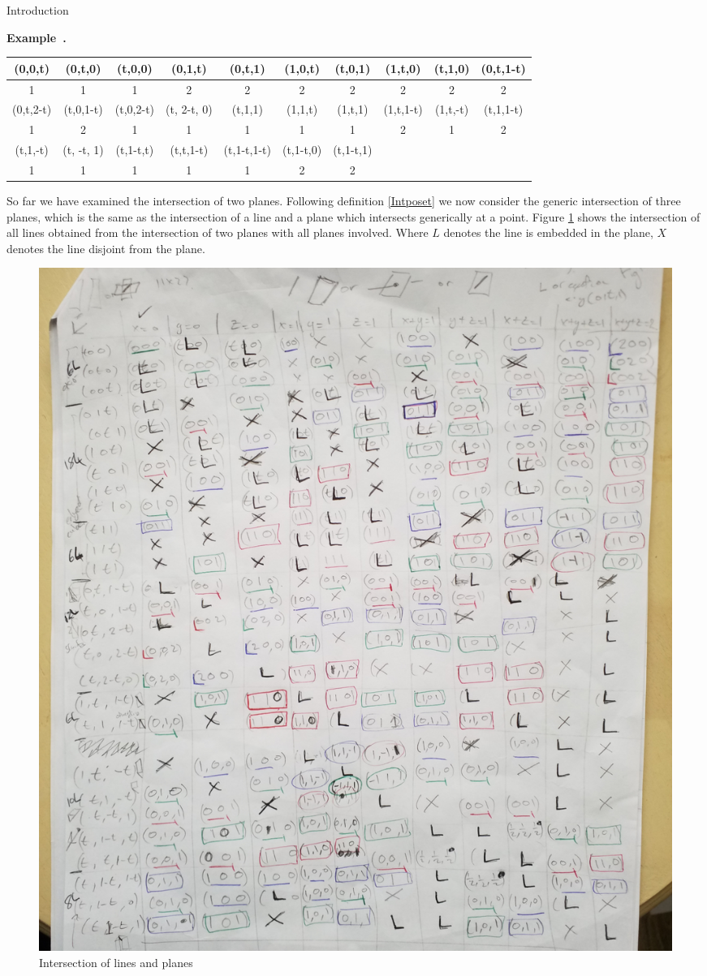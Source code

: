 \documentclass[a4paper,12pt]{article}
\newcounter{example}[]
\newenvironment{example}[1][]{\refstepcounter{example}\par\medskip
   \noindent \textbf{Example~\theexample. #1} \rmfamily}{\medskip}
\theoremstyle{definition}
\theoremstyle{indented}
\begin{document}
\begin{section}{Introduction}
\begin{example}
\begin{center}
\begin{tabular}{ |c|c|c|c|c|c|c|c|c|c| } 
 \hline
(0,0,t)& (0,t,0)& (t,0,0) &(0,1,t) & (0,t,1) & (1,0,t) & (t,0,1) & (1,t,0) & (t,1,0)&  (0,t,1-t)   \\ 
\hline
1&1&1&2&2&2&2&2&2&2\\
\hline
(0,t,2-t) &(t,0,1-t) &(t,0,2-t) &(t, 2-t, 0)& (t,1,1) & (1,1,t)& (1,t,1)&  (1,t,1-t)&  (1,t,-t)& (t,1,1-t)\\
\hline
1&2&1&1&1&1&1&2&1&2\\ 
\hline
(t,1,-t) &(t, -t, 1)& (t,1-t,t) &(t,t,1-t) &(t,1-t,1-t) &(t,1-t,0)  &(t,1-t,1)& & &\\
\hline
  1&1&1&1&1&2&2 & & & \\
 \hline
\end{tabular}
  \caption{} \label{tab:sometab}
\end{center}



So far we have examined the intersection of two planes. Following definition \ref{Intposet} we now consider the generic intersection of three planes, which is the same as the intersection of a line and a plane which intersects generically at a point. Figure \ref{fig 3} shows the intersection of all lines obtained from the intersection of two planes with all planes involved. Where $L$ denotes the line is embedded in the plane, $X$ denotes the line disjoint from the plane. 

\begin{figure}[H]
    \centering
 \includegraphics[scale=0.10,angle=0]{29072020 pics/lineplaneint.jpg}  
    \caption{Intersection of lines and planes}
    \label{fig 3}
\end{figure}


\end{example}
\end{section}
\end{document}
